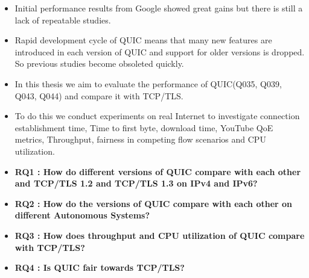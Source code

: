 \begin{frame}
\begin{itemize}
    
    \item Initial performance results from Google showed great gains but there is still a lack
    of repeatable studies.
    
    \item Rapid development cycle of QUIC means
    that many new features are introduced in each version of QUIC and support for older
    versions is dropped. So previous studies become obsoleted quickly.
    
    \item In this thesis we aim to evaluate the performance of QUIC(Q035, Q039, Q043, Q044) and compare it with
    TCP/TLS. 
    
    \item To do this we conduct experiments on real Internet to investigate connection
    establishment time, Time to first byte, download time, YouTube QoE metrics, Throughput,
    fairness in competing flow scenarios and CPU utilization.
    
\end{itemize}
\end{frame}
\clearpage

\begin{frame}
    \begin{itemize}
        \item\textbf{RQ1 : How do different versions of QUIC compare with each other and TCP/TLS 1.2 and TCP/TLS 1.3 on IPv4 and IPv6?}
        
        \item\textbf{RQ2 : How do the versions of QUIC compare with each other on different Autonomous Systems?}

        \item\textbf{RQ3 : How does throughput and CPU utilization of QUIC compare with TCP/TLS?}
        
        
        \item\textbf{RQ4 : Is QUIC fair towards TCP/TLS?}
        
    \end{itemize}
\end{frame}
\clearpage



